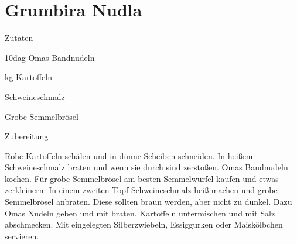 \chapter*{Grumbira Nudla}
\begin{multicols}{2}
 {\Large Zutaten}
 \begin{Zutaten}
		\item 10dag Omas Bandnudeln
		\item {}kg Kartoffeln
		\item Schweineschmalz
		\item Grobe Semmelbrösel
\end{Zutaten}
\columnbreak
{}
\end{multicols}

{\Large Zubereitung} \newline
\begin{addmargin}[1cm]{0cm}
	Rohe Kartoffeln schälen und in dünne Scheiben schneiden. \newline
	In heißem Schweineschmalz braten und wenn sie durch sind zerstoßen. \newline
	Omas Bandnudeln kochen. \newline
	Für grobe Semmelbrösel am besten Semmelwürfel kaufen und etwas zerkleinern. \newline
	In einem zweiten Topf Schweineschmalz heiß machen und grobe Semmelbrösel anbraten. Diese sollten braun werden, aber nicht zu dunkel. \newline
	Dazu Omas Nudeln geben und mit braten. \newline
	Kartoffeln untermischen und mit Salz abschmecken. \newline
	\newline
	Mit eingelegten Silberzwiebeln, Essiggurken oder Maiskölbchen servieren.
\end{addmargin}
